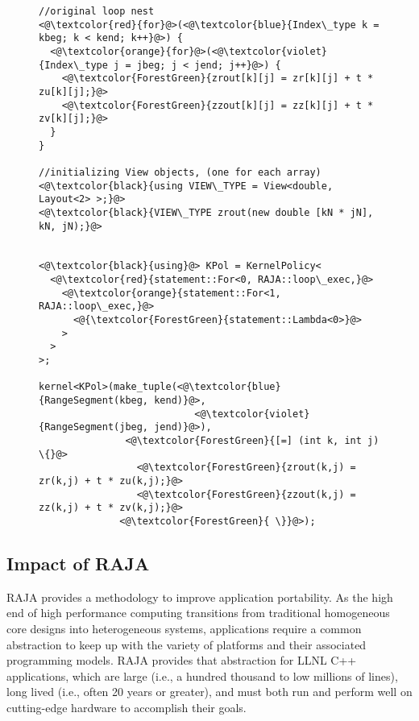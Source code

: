 \begin{figure}
\begin{lstlisting}[label={hydroPort},
    caption={Hydro\_2D Loop (Color indicates code regions of original and RAJA versions that perform similar functions)}]
//original loop nest
<@\textcolor{red}{for}@>(<@\textcolor{blue}{Index\_type k = kbeg; k < kend; k++}@>) {
  <@\textcolor{orange}{for}@>(<@\textcolor{violet}{Index\_type j = jbeg; j < jend; j++}@>) {              
    <@\textcolor{ForestGreen}{zrout[k][j] = zr[k][j] + t * zu[k][j];}@>
    <@\textcolor{ForestGreen}{zzout[k][j] = zz[k][j] + t * zv[k][j];}@>
  }
}

//initializing View objects, (one for each array)
<@\textcolor{black}{using VIEW\_TYPE = View<double, Layout<2> >;}@>
<@\textcolor{black}{VIEW\_TYPE zrout(new double [kN * jN], kN, jN);}@>


<@\textcolor{black}{using}@> KPol = KernelPolicy<
  <@\textcolor{red}{statement::For<0, RAJA::loop\_exec,}@>
    <@\textcolor{orange}{statement::For<1, RAJA::loop\_exec,}@>
      <@{\textcolor{ForestGreen}{statement::Lambda<0>}@>
    >
  >
>;

kernel<KPol>(make_tuple(<@\textcolor{blue}{RangeSegment(kbeg, kend)}@>,
                           <@\textcolor{violet}{RangeSegment(jbeg, jend)}@>),
               <@\textcolor{ForestGreen}{[=] (int k, int j) \{}@>
                 <@\textcolor{ForestGreen}{zrout(k,j) = zr(k,j) + t * zu(k,j);}@>
                 <@\textcolor{ForestGreen}{zzout(k,j) = zz(k,j) + t * zv(k,j);}@>
              <@\textcolor{ForestGreen}{ \}}@>);
\end{lstlisting}
\end{figure}

\subsection{Impact of RAJA}

RAJA provides a methodology to improve application portability.
As the high end of high performance computing transitions from traditional
homogeneous core designs into heterogeneous systems, applications 
require a common abstraction to keep up with the variety of platforms
and their associated programming models.
RAJA provides that abstraction for LLNL C++ applications, which are large
(i.e., a hundred thousand to low millions of lines), long lived (i.e., often
20 years or greater), and must both run and perform well on cutting-edge
hardware to accomplish their goals.

